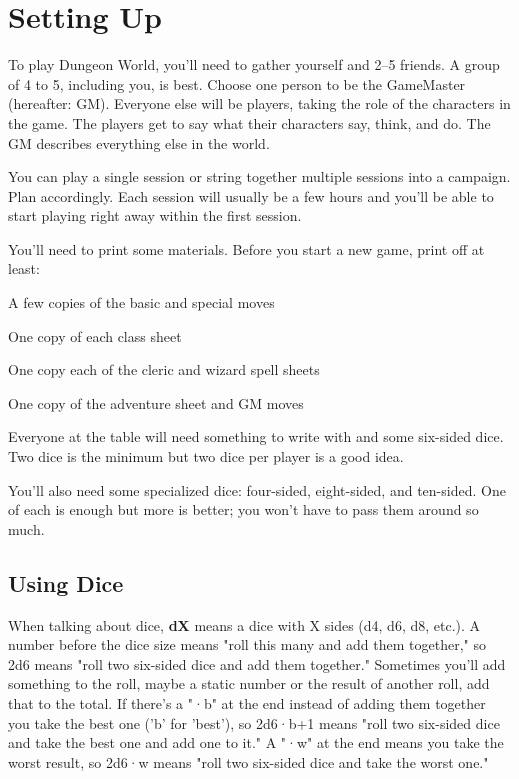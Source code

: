 \chapter{Setting Up}
       

To play Dungeon World, you'll need to gather yourself and 2–5 friends. A group of 4 to 5, including you, is best. Choose one person to be the GameMaster (hereafter: GM). Everyone else will be players, taking the role of the characters in the game. The players get to say what their characters say, think, and do. The GM describes everything else in the world.

       

You can play a single session or string together multiple sessions into a campaign. Plan accordingly. Each session will usually be a few hours and you'll be able to start playing right away within the first session.

       

You'll need to print some materials. Before you start a new game, print off at least:

       
\startitemize[1,packed]
         
\item A few copies of the basic and special moves

         
\item One copy of each class sheet

         
\item One copy each of the cleric and wizard spell sheets

         
\item One copy of the adventure sheet and GM moves

       
\stopitemize
       

Everyone at the table will need something to write with and some six-sided dice. Two dice is the minimum but two dice per player is a good idea.

       

You'll also need some specialized dice: four-sided, eight-sided, and ten-sided. One of each is enough but more is better; you won't have to pass them around so much.

       
\section{Using Dice}   
       

When talking about dice, {\bf dX}  means a dice with X sides (d4, d6, d8, etc.). A number before the dice size means "roll this many and add them together," so 2d6 means "roll two six-sided dice and add them together." Sometimes you'll add something to the roll, maybe a static number or the result of another roll, add that to the total. If there's a "·b" at the end instead of adding them together you take the best one ('b' for 'best'), so 2d6·b+1 means "roll two six-sided dice and take the best one and add one to it." A "·w" at the end means you take the worst result, so 2d6·w means "roll two six-sided dice and take the worst one."

       
